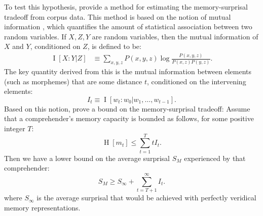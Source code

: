 \documentclass[11pt,letterpaper]{article}
\newcommand{\citep}{\parencite}
\newcommand{\citet}{\Textcite}
\newcommand\mhahn[1]{{\color{red}(#1)}}
\newcounter{theorem}
\newcounter{def}
\newtheorem{thm}[theorem]{Theorem}
\begin{document}
To test this hypothesis, \citet{Hahn2020modeling} provide a method for estimating the memory-surprisal tradeoff from corpus data.
This method is based on the notion of mutual information \citep{cover2006elements}, which quantifies the amount of statistical association between two random variables. 
If $X, Z, Y$ are random variables, then the mutual information of $X$ and $Y$, conditioned on $Z$, is defined to be:
\begin{align}
\label{eq:mi}
   \operatorname{I}[X:Y|Z] &\equiv \sum_{x,y,z} P(x,y,z) \log \frac{P(x,y,z)}{P(x,z)P(y,z)}. %
\end{align}
The key quantity derived from this is the mutual information between elements (such as morphemes) that are some distance $t$, conditioned on the intervening elements:
\begin{equation*}
    I_t \equiv \operatorname{I}[w_t : w_0 | w_1, \dots, w_{t-1}].
\end{equation*}
Based on this notion, \citet{Hahn2020modeling}  prove a bound on the memory-surprisal tradeoff:
Assume that a comprehender's memory capacity is bounded as follows, for some positive integer $T$:
\begin{equation}
\label{eq:memory-bound}
\operatorname{H}[m_t] \le \sum_{t=1}^T t I_t.
\end{equation}
Then we have a lower bound on the average surprisal $S_M$ experienced by that comprehender:
\begin{equation}
\label{eq:surprisal-bound}
S_M \ge S_\infty + \sum_{t=T+1}^\infty I_t.
\end{equation}
where $S_\infty$ is the average surprisal that would be achieved with perfectly veridical memory representations.
\end{document}
